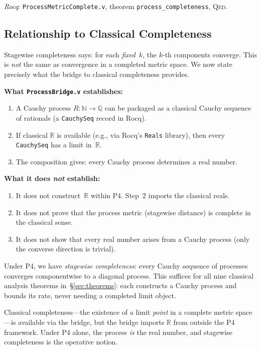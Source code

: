 \documentclass[11pt,a4paper]{article}
\theoremstyle{definition}
\theoremstyle{remark}
\newcommand{\natQ}{\mathbb{N} \to \mathbb{Q}}
\newcommand{\Qed}{\textsc{Qed}}
\begin{document}
\emph{Rocq}: \texttt{ProcessMetricComplete.v}, theorem \texttt{process\_completeness}, \Qed.

\subsection{Relationship to Classical Completeness}
\label{sec:bridge}

Stagewise completeness says: for each \emph{fixed}~$k$, the $k$-th components converge.  This is \emph{not} the same as convergence in a completed metric space.  We now state precisely what the bridge to classical completeness provides.

\textbf{What \texttt{ProcessBridge.v} establishes:}
\begin{enumerate}[nosep]
\item A Cauchy process $R : \natQ$ can be packaged as a classical Cauchy sequence of rationals (a \texttt{CauchySeq} record in Rocq).
\item If classical $\mathbb{R}$ is available (e.g., via Rocq's \texttt{Reals} library), then every \texttt{CauchySeq} has a limit in~$\mathbb{R}$.
\item The composition gives: every Cauchy process determines a real number.
\end{enumerate}

\textbf{What it does \emph{not} establish:}
\begin{enumerate}[nosep]
\item It does not construct~$\mathbb{R}$ within P4.  Step~2 imports the classical reals.
\item It does not prove that the process metric (stagewise distance) is complete in the classical sense.
\item It does not show that every real number arises from a Cauchy process (only the converse direction is trivial).
\end{enumerate}

\begin{keyresult}
Under P4, we have \emph{stagewise completeness}: every Cauchy sequence of processes converges componentwise to a diagonal process.  This suffices for all nine classical analysis theorems in~\S\ref{sec:theorems}: each constructs a Cauchy process and bounds its rate, never needing a completed limit object.

Classical completeness---the existence of a limit \emph{point} in a complete metric space---is available via the bridge, but the bridge imports $\mathbb{R}$ from outside the P4 framework.  Under P4 alone, the process \emph{is} the real number, and stagewise completeness is the operative notion.
\end{keyresult}
\end{document}
